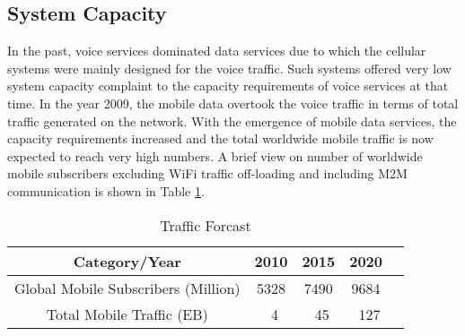 \documentclass[article,10pt,twocolumn]{IEEEtran}
\begin{document}
\subsection{System Capacity}\label{sec:sys_cap}
In the past, voice services dominated data services due to which the cellular systems were mainly designed for the voice traffic. Such systems offered very low system capacity complaint to the capacity requirements of voice services at that time. In the year 2009, the mobile data overtook the voice traffic in terms of total traffic generated on the network. With the emergence of mobile data services, the capacity requirements increased and the total worldwide mobile traffic is now expected to reach very high numbers. A brief view on number of worldwide mobile subscribers excluding WiFi traffic off-loading and including M2M communication \citep{UMTS_2011} is shown in Table \ref{Table:tab1}.
\begin{table}[b]
\vspace{-6mm}
\renewcommand{\arraystretch}{1.25}
    \centering
    \caption{Traffic Forcast}\label{Table:tab1}
\vspace{2mm}
    \begin{tabular}{|c|c|c|c|l|}
    \hline
    \textbf{Category/Year} & \textbf{2010} & \textbf{2015} & \textbf{2020} \\
    \hline
    Global Mobile Subscribers (Million) & 5328 & 7490 & 9684 \\
    \hline
    Total Mobile Traffic (EB) & ~4 & ~45 & ~127 \\
    \hline
    \end{tabular}
\end{table}
\end{document}
